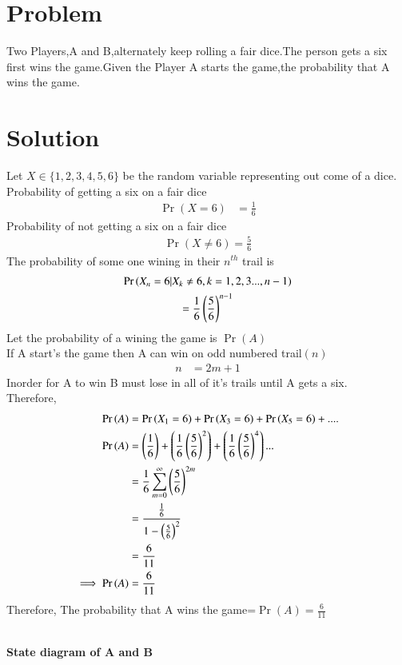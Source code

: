 \documentclass[journal,12pt,twocolumn]{IEEEtran}
\begin{document}
\section{Problem}
Two Players,A and B,alternately keep rolling a fair dice.The person gets a six first wins the game.Given the Player A starts the game,the probability that A wins the game.
\section{Solution}
Let $X\in\{1,2,3,4,5,6\}$ be the random variable representing out come of a dice.\\
Probability of getting a six on a fair dice
\begin{align}
\Pr(X=6) &=\frac{1}{6}
\end{align}
Probability of not getting a six on a fair dice
\begin{align}
\Pr(X\neq6)=\frac{5}{6}
\end{align}
The probability of some one wining in their $n^{th}$ trail is
    \begin{multline}
        \Pr{(X_n=6|X_k\neq6,k=1,2,3...,n-1)}\\
    =\frac{1}{6}\left(\frac{5}{6}\right)^{n-1}
    \end{multline}
Let the probability of a wining the game is $\Pr{(A)}$\\
If A start's the game then A can win on odd numbered trail$(n)$\\
\begin{align}
n&=2m+1
\end{align}
Inorder for A to win B must lose in all of it's trails until A gets a six.\\
Therefore,
\begin{align}
   \Pr{(A)}&=\Pr{(X_1=6)}+\Pr{(X_3=6)}+\Pr{(X_5=6)}+....\\
    \Pr{(A)}&=\left(\frac{1}{6}\right)+\left(\frac{1}{6}\left(\frac{5}{6}\right)^{2}\right)+\left(\frac{1}{6}\left(\frac{5}{6}\right)^{4}\right)...\\
    &=\frac{1}{6}\sum_{m=0}^{\infty}\left(\frac{5}{6}\right)^{2m}\\
    &=\frac{\frac{1}{6}}{1-\left(\frac{5}{6}\right)^2}\\
    &=\frac{6}{11}\\
    \implies \Pr{(A)}&=\frac{6}{11}
\end{align}
Therefore, The probability that A wins the game=$\Pr{(A)=\frac{6}{11}}$
\\
\\
\centerline{ \textbf{State diagram of A and B}}
\end{document}

